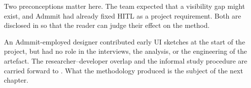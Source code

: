 Two preconceptions matter here. The team expected that a visibility gap might exist, and Admmit had already fixed HITL as a project requirement. Both are disclosed in  so that the reader can judge their effect on the method.

An Admmit-employed designer contributed early UI sketches at the start of the project, but had no role in the interviews, the analysis, or the engineering of the artefact. The researcher--developer overlap and the informal study procedure are carried forward to . What the methodology produced is the subject of the next chapter.
